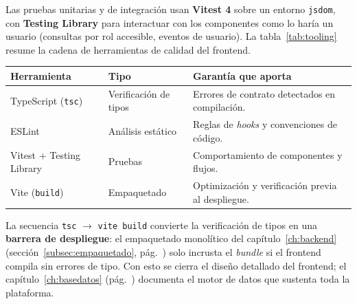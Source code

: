 Las pruebas unitarias y de integración usan \textbf{Vitest 4} sobre un entorno
\texttt{jsdom}, con \textbf{Testing Library} para interactuar con los componentes como lo
haría un usuario (consultas por rol accesible, eventos de usuario). La tabla~\ref{tab:tooling}
resume la cadena de herramientas de calidad del frontend.

\vspace{0.2cm}
\noindent
\renewcommand{\arraystretch}{1.3}
\fontsize{8.5}{10.2}\selectfont\sffamily
\begin{tabularx}{\textwidth}{|L{3.4cm}|L{3.0cm}|Y|}
\hline
{}
\sffamily\textbf{Herramienta} & \sffamily\textbf{Tipo} & \sffamily\textbf{Garantía que aporta} \\
\hline
TypeScript (\texttt{tsc}) & Verificación de tipos & Errores de contrato detectados en compilación. \\ \hline
{}
ESLint & Análisis estático & Reglas de \textit{hooks} y convenciones de código. \\ \hline
Vitest + Testing Library & Pruebas & Comportamiento de componentes y flujos. \\ \hline
{}
Vite (\texttt{build}) & Empaquetado & Optimización y verificación previa al despliegue. \\ \hline
\end{tabularx}
\label{tab:tooling}

\begin{NotaTecnica}
La secuencia \texttt{tsc} $\rightarrow$ \texttt{vite build} convierte la verificación de
tipos en una \textbf{barrera de despliegue}: el empaquetado monolítico del
capítulo~\ref{ch:backend} (sección~\ref{subsec:empaquetado},
pág.~\pageref{subsec:empaquetado}) solo incrusta el \textit{bundle} si el frontend compila
sin errores de tipo. Con esto se cierra el diseño detallado del frontend; el
capítulo~\ref{ch:basedatos} (pág.~\pageref{ch:basedatos}) documenta el motor de datos que
sustenta toda la plataforma.
\end{NotaTecnica}